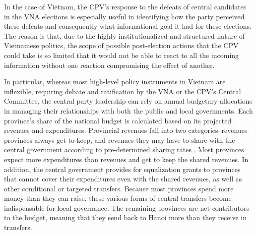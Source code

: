 \documentclass[12pt]{article}
\newcommand{\1}{\mathbbm{1}}
\begin{document}
In the case of Vietnam, the CPV's response to the defeats of central candidates in the VNA elections is especially useful in identifying how the party perceived these defeats and consequently what informational goal it had for these elections. The reason is that, due to the highly institutionalized and structured nature of Vietnamese politics, the scope of possible post-election actions that the CPV could take is so limited that it would not be able to react to all the incoming information without one reaction compromising the effect of another.

In particular, whereas most high-level policy instruments in Vietnam are inflexible, requiring debate and ratification by the VNA or the CPV's Central Committee, the central party leadership can rely on annual budgetary allocations in managing their relationships with both the public and local governments. Each province's share of the national budget is calculated based on its projected revenues and expenditures. Provincial revenues fall into two categories--revenues provinces always get to keep, and revenues they may have to share with the central government according to pre-determined sharing rates \parencite[for more details, see][]{MartinezVazquez2004}. Most provinces expect more expenditures than revenues and get to keep the shared revenues. In addition, the central government provides for equalization grants to provinces that cannot cover their expenditures even with the shared revenues, as well as other conditional or targeted transfers. Because most provinces spend more money than they can raise, these various forms of central transfers become indispensable for local governance. The remaining provinces are net-contributors to the budget, meaning that they send back to Hanoi more than they receive in transfers.
\end{document}
